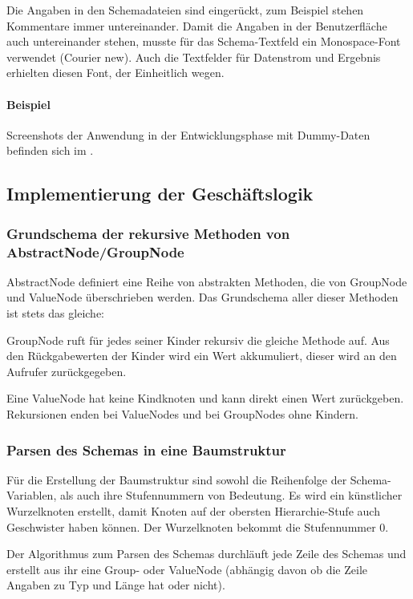 Die Angaben in den Schemadateien sind eingerückt, zum Beispiel stehen Kommentare immer untereinander. Damit die Angaben in der Benutzerfläche auch untereinander stehen, musste für das Schema-Textfeld ein Monospace-Font verwendet (Courier new). Auch die Textfelder für Datenstrom und Ergebnis erhielten diesen Font, der Einheitlich wegen.
\paragraph{Beispiel}
Screenshots der Anwendung in der Entwicklungsphase mit Dummy-Daten befinden sich im .


\subsection{Implementierung der Geschäftslogik}
\label{sec:ImplementierungGeschaeftslogik}

\subsubsection{Grundschema der rekursive Methoden von AbstractNode/GroupNode}
AbstractNode definiert eine Reihe von abstrakten Methoden, die von GroupNode und ValueNode überschrieben werden. Das Grundschema aller dieser Methoden ist stets das gleiche: 

GroupNode ruft für jedes seiner Kinder rekursiv die gleiche Methode auf. Aus den Rückgabewerten der Kinder wird ein Wert akkumuliert, dieser wird an den Aufrufer zurückgegeben.

Eine ValueNode hat keine Kindknoten und kann direkt einen Wert zurückgeben.
Rekursionen enden bei ValueNodes und bei GroupNodes ohne Kindern.

\subsubsection{Parsen des Schemas in eine Baumstruktur}
Für die Erstellung der Baumstruktur sind sowohl die Reihenfolge der Schema-Variablen, als auch ihre Stufennummern von Bedeutung.
Es wird ein künstlicher Wurzelknoten erstellt, damit Knoten auf der obersten Hierarchie-Stufe auch Geschwister haben können. Der Wurzelknoten bekommt die Stufennummer 0.


Der Algorithmus zum Parsen des Schemas durchläuft jede Zeile des Schemas und erstellt aus ihr eine Group- oder ValueNode (abhängig davon ob die Zeile Angaben zu Typ und Länge hat oder nicht).


